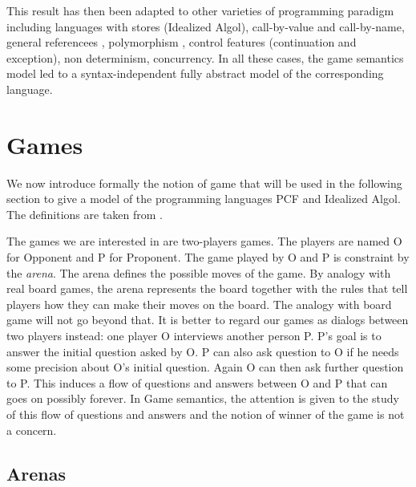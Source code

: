 This result has then been adapted to other varieties of programming
paradigm including languages with stores (Idealized Algol),
call-by-value \citep{honda99gametheoretic, abramsky98callbyvalue}
and call-by-name, general referencees
\citep{DBLP:conf/lics/AbramskyHM98}, polymorphism
\citep{DBLP:journals/apal/AbramskyJ05}, control features
(continuation and exception), non determinism, concurrency. In all
these cases, the game semantics model led to a syntax-independent
fully abstract model of the corresponding language.

\section{Games}
\label{sec:catgames}

We now introduce formally the notion of game that will be used in
the following section to give a model of the programming languages
PCF and Idealized Algol. The definitions are taken from
\cite{abramsky:game-semantics-tutorial, hylandong_pcf,
abramsky94full}.

The games we are interested in are two-players games. The players are named O for Opponent and P for Proponent.
The game played by O and P is constraint by the \emph{arena}.
The arena defines the possible moves of the game. By
analogy with real board games, the arena represents the board
together with the rules that tell players how they can make their moves
on the board. The analogy with board game will not go beyond that.
It is better to regard our games as dialogs between two players instead: one player O
interviews another person P. P's goal is to answer the initial question asked by O.
P can also ask question to O if he needs some precision about O's initial question.
Again O can then ask further question to P. This induces a flow of questions and answers between O and P that can goes on
possibly forever. In Game semantics, the attention is given to the study of this flow of questions and answers
and the notion of winner of the game is not a concern.

\subsection{Arenas}


